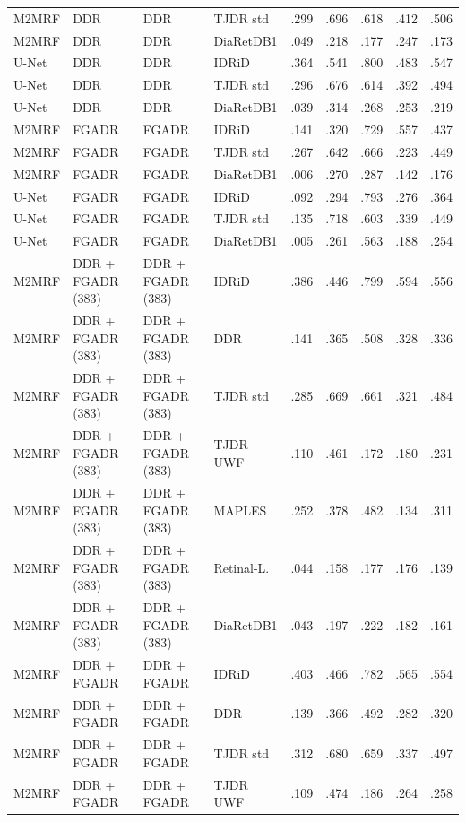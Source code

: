 \begin{landscape}
{\begin{longtable}{l l l l c c c c c}
M2MRF & DDR & DDR & TJDR std & .299 & .696 & .618 & .412 & .506 \\
M2MRF & DDR & DDR & DiaRetDB1 & .049 & .218 & .177 & .247 & .173 \\
U-Net & DDR & DDR & IDRiD & .364 & .541 & .800 & .483 & .547 \\
U-Net & DDR & DDR & TJDR std & .296 & .676 & .614 & .392 & .494 \\
U-Net & DDR & DDR & DiaRetDB1 & .039 & .314 & .268 & .253 & .219 \\
M2MRF & FGADR & FGADR & IDRiD & .141 & .320 & .729 & .557 & .437 \\
M2MRF & FGADR & FGADR & TJDR std & .267 & .642 & .666 & .223 & .449 \\
M2MRF & FGADR & FGADR & DiaRetDB1 & .006 & .270 & .287 & .142 & .176 \\
U-Net & FGADR & FGADR & IDRiD & .092 & .294 & .793 & .276 & .364 \\
U-Net & FGADR & FGADR & TJDR std & .135 & .718 & .603 & .339 & .449 \\
U-Net & FGADR & FGADR & DiaRetDB1 & .005 & .261 & .563 & .188 & .254 \\
M2MRF & DDR + FGADR (383) & DDR + FGADR (383) & IDRiD & .386 & .446 & .799 & .594 & .556 \\
M2MRF & DDR + FGADR (383) & DDR + FGADR (383) & DDR & .141 & .365 & .508 & .328 & .336 \\
M2MRF & DDR + FGADR (383) & DDR + FGADR (383) & TJDR std & .285 & .669 & .661 & .321 & .484 \\
M2MRF & DDR + FGADR (383) & DDR + FGADR (383) & TJDR UWF & .110 & .461 & .172 & .180 & .231 \\
M2MRF & DDR + FGADR (383) & DDR + FGADR (383) & MAPLES & .252 & .378 & .482 & .134 & .311 \\
M2MRF & DDR + FGADR (383) & DDR + FGADR (383) & Retinal-L. & .044 & .158 & .177 & .176 & .139 \\
M2MRF & DDR + FGADR (383) & DDR + FGADR (383) & DiaRetDB1 & .043 & .197 & .222 & .182 & .161 \\
M2MRF & DDR + FGADR & DDR + FGADR & IDRiD & .403 & .466 & .782 & .565 & .554 \\
M2MRF & DDR + FGADR & DDR + FGADR & DDR & .139 & .366 & .492 & .282 & .320 \\
M2MRF & DDR + FGADR & DDR + FGADR & TJDR std & .312 & .680 & .659 & .337 & .497 \\
M2MRF & DDR + FGADR & DDR + FGADR & TJDR UWF & .109 & .474 & .186 & .264 & .258 \\

\end{longtable}}
\end{landscape}
